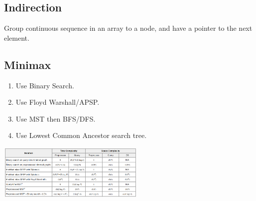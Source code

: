 \documentclass[10pt,landscape,a4paper]{article}
\begin{document}
\begin{multicols*}{4}
\begin{tabular}{p{1.5cm}p{5cm}}
    
\end{tabular}

\subsection{Indirection}
Group continuous sequence in an array to a node, and have a pointer to the next element.


\subsection{Minimax}
\begin{enumerate}
    \item Use Binary Search.
    \item Use Floyd Warshall/APSP.
    \item Use MST then BFS/DFS.
    \item Use Lowest Common Ancestor search tree.
\end{enumerate}
\includegraphics[width=7cm]{minimax}


\end{multicols*}
\end{document}
